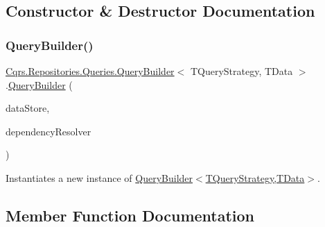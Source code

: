 \subsection{Constructor \& Destructor Documentation}
\mbox{\label{classCqrs_1_1Repositories_1_1Queries_1_1QueryBuilder_a8a7b6495f78adedc7b7a82d2c83f17d5_a8a7b6495f78adedc7b7a82d2c83f17d5}} 
\subsubsection{\texorpdfstring{Query\+Builder()}{QueryBuilder()}}
{\footnotesize\ttfamily \hyperlink{classCqrs_1_1Repositories_1_1Queries_1_1QueryBuilder}{Cqrs.\+Repositories.\+Queries.\+Query\+Builder}$<$ T\+Query\+Strategy, T\+Data $>$.\hyperlink{classCqrs_1_1Repositories_1_1Queries_1_1QueryBuilder}{Query\+Builder} (\begin{DoxyParamCaption}\item[{\hyperlink{interfaceCqrs_1_1DataStores_1_1IDataStore}{I\+Data\+Store}$<$ T\+Data $>$}]{data\+Store,  }\item[{\hyperlink{interfaceCqrs_1_1Configuration_1_1IDependencyResolver}{I\+Dependency\+Resolver}}]{dependency\+Resolver }\end{DoxyParamCaption})\hspace{0.3cm}{\ttfamily [protected]}}



Instantiates a new instance of \hyperlink{classCqrs_1_1Repositories_1_1Queries_1_1QueryBuilder_a8a7b6495f78adedc7b7a82d2c83f17d5_a8a7b6495f78adedc7b7a82d2c83f17d5}{Query\+Builder$<$\+T\+Query\+Strategy,\+T\+Data$>$}. 



\subsection{Member Function Documentation}
\mbox{\label{classCqrs_1_1Repositories_1_1Queries_1_1QueryBuilder_aea4b78b2633babfaea0862f2a365c7d3_aea4b78b2633babfaea0862f2a365c7d3}} 
